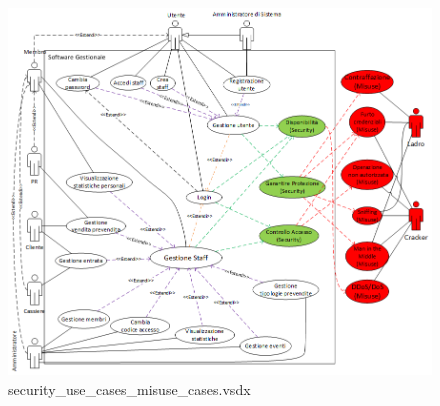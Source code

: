 \documentclass[a4paper]{article}
\begin{document}
\begin{figure}[H]
    \includegraphics[scale=0.75]{Analisi/Cases/security_use_cases_misuse_cases.png}
    \centering
    \caption{security\_use\_cases\_misuse\_cases.vsdx}
\end{figure}

\newpage
\end{document}
